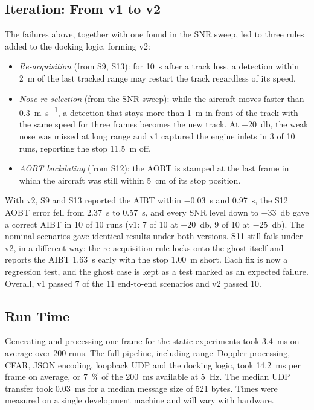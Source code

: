 \documentclass[conference]{IEEEtran}
\begin{document}
\subsection{Iteration: From v1 to v2}
\label{sec:iteration}
The failures above, together with one found in the SNR sweep, led to three rules added to the docking logic, forming v2:
\begin{itemize}
  \item \emph{Re-acquisition} (from S9, S13): for \SI{10}{\second} after a track loss, a detection within \SI{2}{\metre} of the last tracked range may restart the track regardless of its speed.
  \item \emph{Nose re-selection} (from the SNR sweep): while the aircraft moves faster than \SI{0.3}{\metre\per\second}, a detection that stays more than \SI{1}{\metre} in front of the track with the same speed for three frames becomes the new track. At \SI{-20}{\decibel}, the weak nose was missed at long range and v1 captured the engine inlets in 3 of 10 runs, reporting the stop \SI{11.5}{\metre} off.
  \item \emph{AOBT backdating} (from S12): the AOBT is stamped at the last frame in which the aircraft was still within \SI{5}{\centi\metre} of its stop position.
\end{itemize}

With v2, S9 and S13 reported the AIBT within \SI{-0.03}{\second} and \SI{+0.97}{\second}, the S12 AOBT error fell from \SI{2.37}{\second} to \SI{0.57}{\second}, and every SNR level down to \SI{-33}{\decibel} gave a correct AIBT in 10 of 10 runs (v1: 7 of 10 at \SI{-20}{\decibel}, 9 of 10 at \SI{-25}{\decibel}). The nominal scenarios gave identical results under both versions. S11 still fails under v2, in a different way: the re-acquisition rule locks onto the ghost itself and reports the AIBT \SI{1.63}{\second} early with the stop \SI{1.00}{\metre} short. Each fix is now a regression test, and the ghost case is kept as a test marked as an expected failure. Overall, v1 passed 7 of the 11 end-to-end scenarios and v2 passed 10.

\subsection{Run Time}
Generating and processing one frame for the static experiments took \SI{3.4}{\milli\second} on average over 200 runs. The full pipeline, including range--Doppler processing, CFAR, JSON encoding, loopback UDP and the docking logic, took \SI{14.2}{\milli\second} per frame on average, or \SI{7}{\percent} of the \SI{200}{\milli\second} available at \SI{5}{\hertz}. The median UDP transfer took \SI{0.03}{\milli\second} for a median message size of 521 bytes. Times were measured on a single development machine and will vary with hardware.
\end{document}
